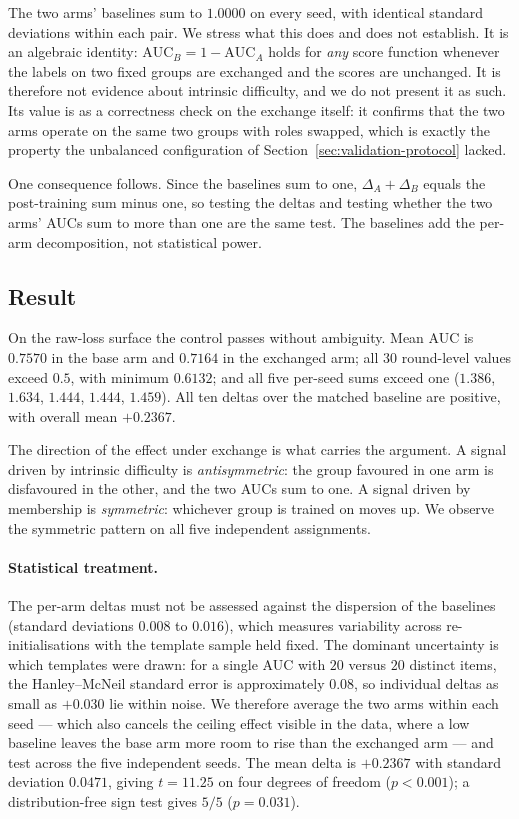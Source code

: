 The two arms' baselines sum to $1.0000$ on every seed, with identical
standard deviations within each pair. We stress what this does and does
not establish. It is an algebraic identity:
$\mathrm{AUC}_B = 1 - \mathrm{AUC}_A$ holds for \emph{any} score function
whenever the labels on two fixed groups are exchanged and the scores are
unchanged. It is therefore not evidence about intrinsic difficulty, and we
do not present it as such. Its value is as a correctness check on the
exchange itself: it confirms that the two arms operate on the same two
groups with roles swapped, which is exactly the property the unbalanced
configuration of Section~\ref{sec:validation-protocol} lacked.

One consequence follows. Since the baselines sum to one,
$\Delta_A + \Delta_B$ equals the post-training sum minus one, so testing
the deltas and testing whether the two arms' AUCs sum to more than one are
the same test. The baselines add the per-arm decomposition, not
statistical power.

\subsection{Result}
\label{sec:validation-result}

On the raw-loss surface the control passes without ambiguity. Mean AUC is
$0.7570$ in the base arm and $0.7164$ in the exchanged arm; all $30$
round-level values exceed $0.5$, with minimum $0.6132$; and all five
per-seed sums exceed one ($1.386$, $1.634$, $1.444$, $1.444$, $1.459$).
All ten deltas over the matched baseline are positive, with overall mean
$+0.2367$.

The direction of the effect under exchange is what carries the argument. A
signal driven by intrinsic difficulty is \emph{antisymmetric}: the group
favoured in one arm is disfavoured in the other, and the two AUCs sum to
one. A signal driven by membership is \emph{symmetric}: whichever group is
trained on moves up. We observe the symmetric pattern on all five
independent assignments.

\paragraph{Statistical treatment.} The per-arm deltas must not be assessed
against the dispersion of the baselines (standard deviations $0.008$ to
$0.016$), which measures variability across re-initialisations with the
template sample held fixed. The dominant uncertainty is which templates
were drawn: for a single AUC with $20$ versus $20$ distinct items, the
Hanley--McNeil standard error is approximately $0.08$, so individual
deltas as small as $+0.030$ lie within noise. We therefore average the two
arms within each seed --- which also cancels the ceiling effect visible in
the data, where a low baseline leaves the base arm more room to rise than
the exchanged arm --- and test across the five independent seeds. The mean
delta is $+0.2367$ with standard deviation $0.0471$, giving $t = 11.25$ on
four degrees of freedom ($p < 0.001$); a distribution-free sign test gives
$5/5$ ($p = 0.031$).

